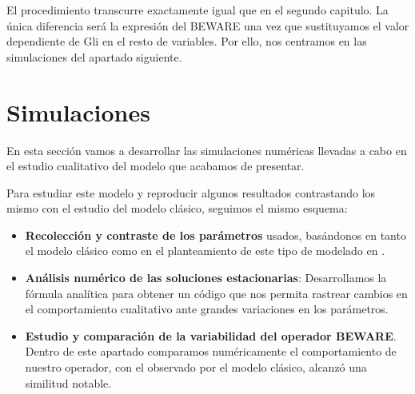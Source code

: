 El procedimiento transcurre exactamente igual que en el segundo capitulo. La única diferencia será la expresión del BEWARE una vez que sustituyamos el valor dependiente de Gli en el resto de variables. Por ello, nos centramos en las simulaciones del apartado siguiente.


\section{Simulaciones}
En esta sección vamos a desarrollar las simulaciones numéricas llevadas a cabo en el estudio cualitativo del modelo que acabamos de presentar.

Para estudiar este modelo y reproducir algunos resultados contrastando los mismo con el estudio del modelo clásico, seguimos el mismo esquema:
\begin{itemize}
	\item \textbf{Recolección y contraste de los parámetros} usados, basándonos en tanto el modelo clásico como en el planteamiento de este tipo de modelado en \cite{cambon1}. 
	\item \textbf{Análisis numérico de las soluciones estacionarias}: Desarrollamos la fórmula analítica para obtener un código que nos permita rastrear cambios en el comportamiento cualitativo ante grandes variaciones en los parámetros.
	\item \textbf{Estudio y comparación de la variabilidad del operador BEWARE}. Dentro de este apartado comparamos numéricamente el comportamiento de nuestro operador, con el observado por el modelo clásico, alcanzó una similitud notable.

\end{itemize}
